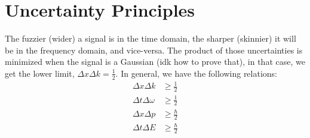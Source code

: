 \documentclass[12pt]{article}
\begin{document}
\section{Uncertainty Principles}
The fuzzier (wider) a signal is in the time domain, the sharper (skinnier) it will be in the frequency domain, and vice-versa. The product of those uncertainties is minimized when the signal is a Gaussian (idk how to prove that), in that case, we get the lower limit, $\Delta x \Delta k = \frac{1}{2}$. In general, we have the following relations:
\begin{align*}
    \Delta x \Delta k &\geq \frac{1}{2} \\
    \Delta t \Delta \omega &\geq \frac{1}{2} \\
    \Delta x \Delta p &\geq \frac{\hbar}{2} \\
    \Delta t \Delta E &\geq \frac{\hbar}{2}
\end{align*}
\end{document}
